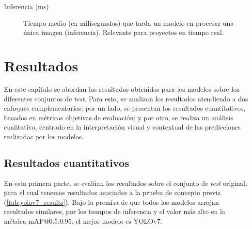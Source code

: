 \documentclass[12pt,a4paper,onecolumn,oneside]{report}
\begin{document}
\begin{description}
  \item[Inferencia (ms)] Tiempo medio (en milisegundos) que tarda un modelo en procesar una única imagen (inferencia). Relevante para proyectos en tiempo real.

\end{description}


\chapter{Resultados} %
\label{Resultados}

En este capítulo se abordan los resultados obtenidos para los modelos sobre los diferentes conjuntos de \textit{test}. Para esto, se analizan 
los resultados atendiendo a dos enfoques complementarios: 
por un lado, se presentan los resultados cuantitativos, basados en métricas objetivas de evaluación; y por otro, se realiza un análisis cualitativo, 
centrado en la interpretación visual y contextual de las predicciones realizadas por los modelos.

\section{Resultados cuantitativos}
\label{sec:Resultados cuantitativos}

En esta primera parte, se evalúan los resultados sobre el conjunto de \textit{test} original, para el cual tenemos resultados asociados
a la prueba de concepto previa (\autoref{tab:yolov7_results}). Bajo la premisa de que todos los modelos arrojan resultados similares, por los tiempos de inferencia y 
el valor más alto en la métrica mAP@0.5:0.95, el mejor modelo es YOLOv7.

\begin{table}[H]
  \caption{Resultados de los modelos en la prueba de concepto inicial}
  \centering
  \label{tab:yolov7_results}
\end{table}
\end{document}
